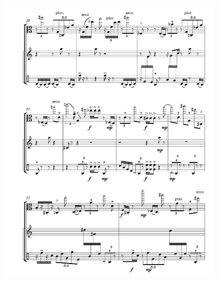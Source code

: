 \begin{figure}[htbp]
    \centering
	\includegraphics[width=6.5in]{figures/Viola_Percussion_5.pdf}
\end{figure}

